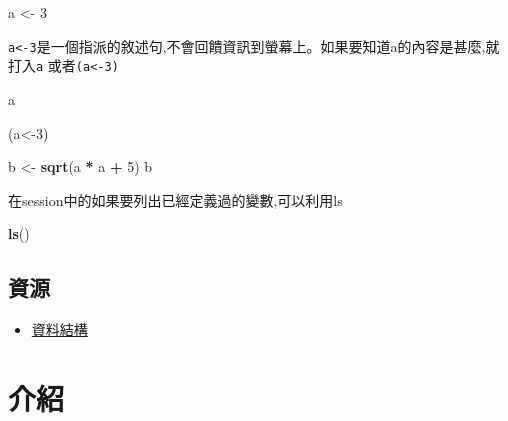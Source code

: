 \documentclass[]{book}
\newenvironment{Shaded}{\begin{snugshade}}{\end{snugshade}}
\newcommand{\DecValTok}[1]{\textcolor[rgb]{0.00,0.00,0.81}{#1}}
\newcommand{\KeywordTok}[1]{\textcolor[rgb]{0.13,0.29,0.53}{\textbf{#1}}}
\newcommand{\NormalTok}[1]{#1}
\newcommand{\OperatorTok}[1]{\textcolor[rgb]{0.81,0.36,0.00}{\textbf{#1}}}
\newcommand{\StringTok}[1]{\textcolor[rgb]{0.31,0.60,0.02}{#1}}
\providecommand{\tightlist}{%
  \setlength{\itemsep}{0pt}\setlength{\parskip}{0pt}}
\theoremstyle{definition}
\theoremstyle{definition}
\theoremstyle{definition}
\theoremstyle{remark}
\begin{document}
\begin{Shaded}
\begin{Highlighting}[]
\NormalTok{a <-}\StringTok{ }\DecValTok{3}
\end{Highlighting}
\end{Shaded}

\texttt{a\textless{}-3}是一個指派的敘述句,不會回饋資訊到螢幕上。如果要知道a的內容是甚麼,就打入\texttt{a}
或者\texttt{(a\textless{}-3)}

\begin{Shaded}
\begin{Highlighting}[]
\NormalTok{    a}
\end{Highlighting}
\end{Shaded}

\begin{Shaded}
\begin{Highlighting}[]
\NormalTok{(a<-}\DecValTok{3}\NormalTok{)}
\end{Highlighting}
\end{Shaded}

\begin{Shaded}
\begin{Highlighting}[]
\NormalTok{b <-}\StringTok{ }\KeywordTok{sqrt}\NormalTok{(a }\OperatorTok{*}\StringTok{ }\NormalTok{a }\OperatorTok{+}\StringTok{ }\DecValTok{5}\NormalTok{)}
\NormalTok{b}
\end{Highlighting}
\end{Shaded}

在session中的如果要列出已經定義過的變數,可以利用ls

\begin{Shaded}
\begin{Highlighting}[]
\KeywordTok{ls}\NormalTok{()}
\end{Highlighting}
\end{Shaded}

\subsection{資源}

\begin{itemize}
\tightlist
\item
  \href{http://adv-r.had.co.nz/Data-structures.html}{資料結構}
\end{itemize}

\section{介紹}
\end{document}
